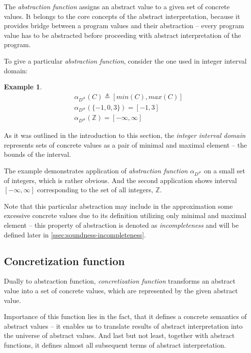 \documentclass[12pt,oneside]{fithesis2}
\theoremstyle{definition}
\newtheorem{exmp}{Example}[section]
\begin{document}
The \textit{abstraction function} assigns an abstract value to a given set of concrete values. It belongs to the core concepts of the abstract interpretation, because it provides bridge between a program values and their abstraction -- every program value has to be abstracted before proceeding with abstract interpretation of the program.

To give a particular \textit{abstraction function}, consider the one used in integer interval domain:

\begin{exmp}
  \begin{align*}
    &\alpha_{D^\#}(C) \triangleq [min(C), max(C)]\\
    &\alpha_{D^\#}(\{-1, 0, 3\}) = [-1, 3]\\
    &\alpha_{D^\#}(\mathbb Z) = [-\infty, \infty]
  \end{align*}
\end{exmp}

As it was outlined in the introduction to this section, the \textit{integer interval domain} represents sets of concrete values as a pair of minimal and maximal element -- the bounds of the interval.

The example demonstrates application of \textit{abstraction function} $\alpha_{D^\#}$ on a small set of integers, which is rather obvious. And the second application shows interval $[-\infty, \infty]$ corresponding to the set of all integers, $\mathbb Z$.

Note that this particular abstraction may include in the approximation some excessive concrete values due to its definition utilizing only minimal and maximal element -- this property of abstraction is denoted as \textit{incompleteness} and will be defined later in \ref{ssec:soundness-incompleteness}.

\subsection{Concretization function}
Dually to abstraction function, \textit{concretization function} transforms an abstract value into a set of concrete values, which are represented by the given abstract value.

Importance of this function lies in the fact, that it defines a concrete semantics of abstract values -- it enables us to translate results of abstract interpretation into the universe of abstract values. And last but not least, together with abstract functions, it defines almost all subsequent terms of abstract interpretation.
\end{document}
